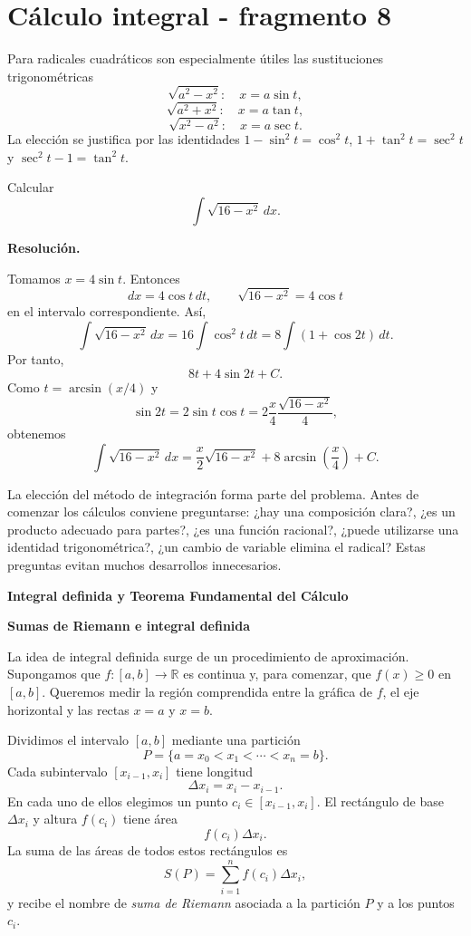 \section{Cálculo integral - fragmento 8}
Para radicales cuadráticos son especialmente útiles las sustituciones trigonométricas
\[
\sqrt{a^2-x^2}:\quad x=a\sin t,
\]
\[
\sqrt{a^2+x^2}:\quad x=a\tan t,
\]
\[
\sqrt{x^2-a^2}:\quad x=a\sec t.
\]
La elección se justifica por las identidades $1-\sin^2t=\cos^2t$, $1+\tan^2t=\sec^2t$ y $\sec^2t-1=\tan^2t$.

\begin{solvedexercise}
Calcular
\[
\int\sqrt{16-x^2}\,dx.
\]

\textbf{Resolución.}\par\smallskip
Tomamos $x=4\sin t$. Entonces
\[
dx=4\cos t\,dt,
\qquad
\sqrt{16-x^2}=4\cos t
\]
en el intervalo correspondiente. Así,
\[
\int\sqrt{16-x^2}\,dx
=16\int\cos^2t\,dt
=8\int(1+\cos2t)\,dt.
\]
Por tanto,
\[
8t+4\sin2t+C.
\]
Como $t=\arcsin(x/4)$ y
\[
\sin2t=2\sin t\cos t
=2\frac{x}{4}\frac{\sqrt{16-x^2}}{4},
\]
obtenemos
\[
\boxed{\int\sqrt{16-x^2}\,dx
=\frac{x}{2}\sqrt{16-x^2}+8\arcsin\left(\frac{x}{4}\right)+C.}
\]
\end{solvedexercise}

La elección del método de integración forma parte del problema. Antes de comenzar los cálculos conviene preguntarse: ¿hay una composición clara?, ¿es un producto adecuado para partes?, ¿es una función racional?, ¿puede utilizarse una identidad trigonométrica?, ¿un cambio de variable elimina el radical? Estas preguntas evitan muchos desarrollos innecesarios.

\textbf{Integral definida y Teorema Fundamental del Cálculo}

\textbf{Sumas de Riemann e integral definida}

La idea de integral definida surge de un procedimiento de aproximación. Supongamos que $f:[a,b]\to\mathbb{R}$ es continua y, para comenzar, que $f(x)\geq0$ en $[a,b]$. Queremos medir la región comprendida entre la gráfica de $f$, el eje horizontal y las rectas $x=a$ y $x=b$.

Dividimos el intervalo $[a,b]$ mediante una partición
\[
P=\{a=x_0<x_1<\cdots<x_n=b\}.
\]
Cada subintervalo $[x_{i-1},x_i]$ tiene longitud
\[
\Delta x_i=x_i-x_{i-1}.
\]
En cada uno de ellos elegimos un punto $c_i\in[x_{i-1},x_i]$. El rectángulo de base $\Delta x_i$ y altura $f(c_i)$ tiene área
\[
f(c_i)\Delta x_i.
\]
La suma de las áreas de todos estos rectángulos es
\[
S(P)=\sum_{i=1}^{n} f(c_i)\Delta x_i,
\]
y recibe el nombre de \emph{suma de Riemann} asociada a la partición $P$ y a los puntos $c_i$.


